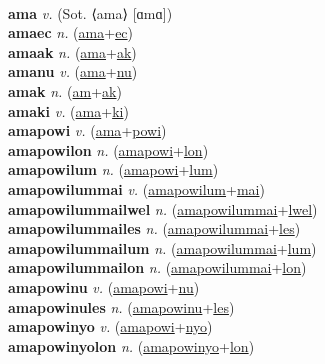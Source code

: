  \label{'amelikatulsetupel} \\
\textbf{ama} \textit{v.} (Sot. ⟨ama⟩ [ɑmɑ])
 \label{ama} \\
\textbf{amaec} \textit{n.} (\hyperref[ama]{ama}+\hyperref[ec]{ec})
 \label{amaec} \\
\textbf{amaak} \textit{n.} (\hyperref[ama]{ama}+\hyperref[ak]{ak})
 \label{amaak} \\
\textbf{amanu} \textit{v.} (\hyperref[ama]{ama}+\hyperref[nu]{nu})
 \label{amanu} \\
\textbf{amak} \textit{n.} (\hyperref[am]{am}+\hyperref[ak]{ak})
 \label{amak} \\
\textbf{amaki} \textit{v.} (\hyperref[ama]{ama}+\hyperref[ki]{ki})
 \label{amaki} \\
\textbf{amapowi} \textit{v.} (\hyperref[ama]{ama}+\hyperref[powi]{powi})
 \label{amapowi} \\
\textbf{amapowilon} \textit{n.} (\hyperref[amapowi]{amapowi}+\hyperref[lon]{lon})
 \label{amapowilon} \\
\textbf{amapowilum} \textit{n.} (\hyperref[amapowi]{amapowi}+\hyperref[lum]{lum})
 \label{amapowilum} \\
\textbf{amapowilummai} \textit{v.} (\hyperref[amapowilum]{amapowilum}+\hyperref[mai]{mai})
 \label{amapowilummai} \\
\textbf{amapowilummailwel} \textit{n.} (\hyperref[amapowilummai]{amapowilummai}+\hyperref[lwel]{lwel})
 \label{amapowilummailwel} \\
\textbf{amapowilummailes} \textit{n.} (\hyperref[amapowilummai]{amapowilummai}+\hyperref[les]{les})
 \label{amapowilummailes} \\
\textbf{amapowilummailum} \textit{n.} (\hyperref[amapowilummai]{amapowilummai}+\hyperref[lum]{lum})
 \label{amapowilummailum} \\
\textbf{amapowilummailon} \textit{n.} (\hyperref[amapowilummai]{amapowilummai}+\hyperref[lon]{lon})
 \label{amapowilummailon} \\
\textbf{amapowinu} \textit{v.} (\hyperref[amapowi]{amapowi}+\hyperref[nu]{nu})
 \label{amapowinu} \\
\textbf{amapowinules} \textit{n.} (\hyperref[amapowinu]{amapowinu}+\hyperref[les]{les})
 \label{amapowinules} \\
\textbf{amapowinyo} \textit{v.} (\hyperref[amapowi]{amapowi}+\hyperref[nyo]{nyo})
 \label{amapowinyo} \\
\textbf{amapowinyolon} \textit{n.} (\hyperref[amapowinyo]{amapowinyo}+\hyperref[lon]{lon})
 \label{amapowinyolon} \\
